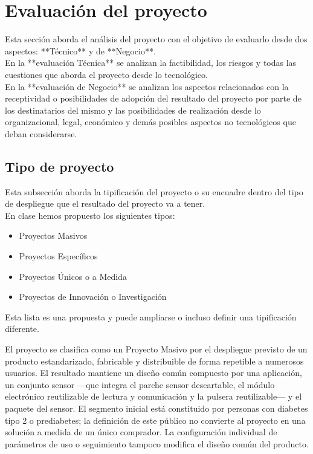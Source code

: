 \section{Evaluación del proyecto}
{\consigna
Esta sección aborda el análisis del proyecto con el objetivo de evaluarlo desde dos aspectos: **Técnico** y de **Negocio**.\\
En la **evaluación Técnica** se analizan la factibilidad, los riesgos y todas las cuestiones que aborda el proyecto desde lo tecnológico.\\
En la **evaluación de Negocio** se analizan los aspectos relacionados con la receptividad o posibilidades de adopción del resultado del proyecto por parte de los destinatarios del mismo y las posibilidades de realización desde lo organizacional, legal, económico y demás posibles aspectos no tecnológicos que deban considerarse.
}


\subsection{Tipo de proyecto}
{\consigna
Esta subsección aborda la tipificación del proyecto o su encuadre dentro del tipo de despliegue que el resultado del proyecto va a tener.\\
En clase hemos propuesto los siguientes tipos:
\begin{itemize}
\setlength{\itemsep}{0pt}
  \item Proyectos Masivos
  \item Proyectos Específicos
  \item Proyectos Únicos o a Medida
  \item Proyectos de Innovación o Investigación
\end{itemize}
Esta lista es una propuesta y puede ampliarse o incluso definir una tipificación diferente.
}


El proyecto se clasifica como un Proyecto Masivo por el despliegue previsto de un producto estandarizado, fabricable y distribuible de forma repetible a numerosos usuarios. El resultado mantiene un diseño común compuesto por una aplicación, un conjunto sensor ---que integra el parche sensor descartable, el módulo electrónico reutilizable de lectura y comunicación y la pulsera reutilizable--- y el paquete del sensor. El segmento inicial está constituido por personas con diabetes tipo 2 o prediabetes; la definición de este público no convierte al proyecto en una solución a medida de un único comprador. La configuración individual de parámetros de uso o seguimiento tampoco modifica el diseño común del producto.

